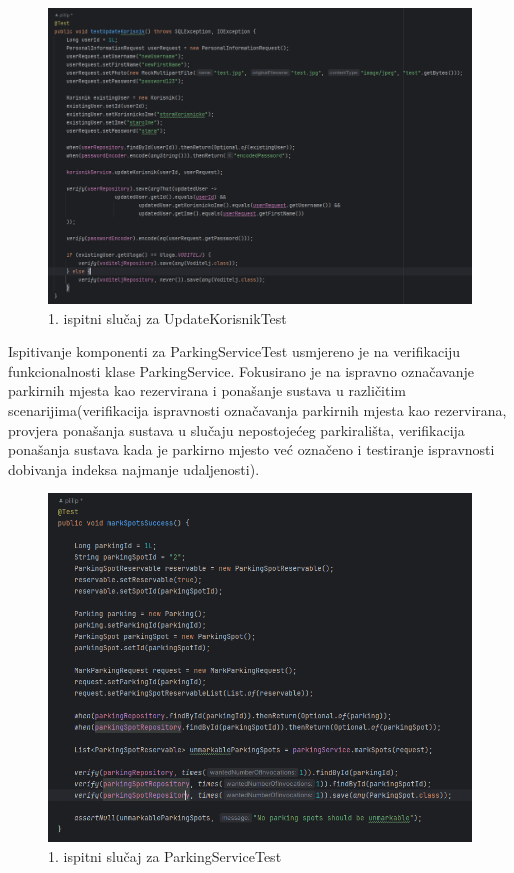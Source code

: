 \begin{figure}[H]
	\includegraphics[width=\textwidth]{slike/testupdatekorisnik.png} %
	\centering
	\caption{1. ispitni slučaj za UpdateKorisnikTest}
	\label{fig:dijagramstanja}
\end{figure}


Ispitivanje komponenti za ParkingServiceTest usmjereno je na verifikaciju funkcionalnosti klase ParkingService. Fokusirano je na ispravno označavanje parkirnih mjesta kao rezervirana i ponašanje sustava u različitim scenarijima(verifikacija ispravnosti označavanja parkirnih mjesta kao rezervirana, provjera ponašanja sustava u slučaju nepostojećeg parkirališta, verifikacija ponašanja sustava kada je parkirno mjesto već označeno i testiranje ispravnosti dobivanja indeksa najmanje udaljenosti).

\begin{figure}[H]
	\includegraphics[width=\textwidth]{slike/markspotsuccess.png} %
	\centering
	\caption{1. ispitni slučaj za ParkingServiceTest}
	\label{fig:dijagramstanja}
\end{figure}


